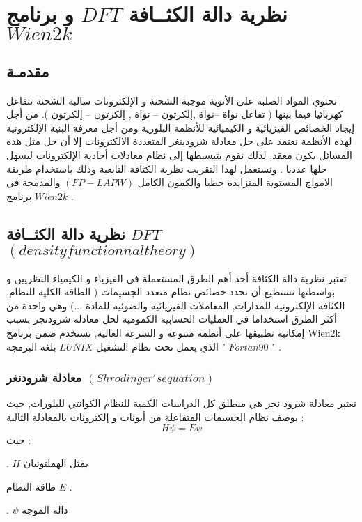 
\chapter{  نظرية دالة الكثــافة $ DFT $ و برنامج $ Wien2k $  } %

\label{Chapter2} 


\section*{ مقدمـة }

تحتوي المواد الصلبة على الأنوية موجبة الشحنة و الإلكترونات سالبة الشحنة تتفاعل كهربائيا فيما بينها ( تفاعل نواة –نواة ,إلكرتون – نواة , إلكرتون – إلكرتون ). 
من أجل إيجاد الخصائص الفيزيائية و الكيميائية للأنظمة البلورية ومن أجل معرفة البنية الإلكترونية لهذه الأنظمة  نعتمد على حل معادلة  شرودينغر المتعددة الالكترونات إلا أن حل مثل هذه المسائل يكون معقد, لذلك نقوم بتبسيطها إلى نظام معادلات أحادية الإلكترونات ليسهل حلها عدديا . ونستعمل لهذا التقريب نظرية الكثافة التابعية وذلك باستخدام طريقة الامواج المستوية المتزايدة خطيا والكمون الكامل $ (FP-LAPW) $ والمدمجة في برنامج $ Wien2k $ .

\section{ ‫نظرية دالة الكثــافة‬ ‫‪$ DFT‬‬ $ $ ( density functionnal theory ) $ }

تعتبر نظرية دالة الكثافة أحد أهم الطرق المستعملة  في الفيزياء و الكيمياء النظريين  و بواسطتها نستطيع أن نحدد خصائص نظام متعدد الجسيمات ( الطاقة الكلية للنظام, الكثافة الإلكترونية للمدارات, المعاملات الفيزيائية والضوئية للمادة ...)   وهي واحدة من أكثر الطرق استخداما في العمليات الحسابية الكمومية  لحل معادلة شرودنجر بسبب إمكانية تطبيقها على أنظمة متنوعة و السرعة العالية, تستخدم ضمن برنامج Wien2k الذي يعمل تحت نظام التشغيل $ LUNIX  $ بلغة البرمجة " $ Fortan 90 $ " .
\\


\subsection{ معادلة شرودنغر $ ( Shrodinger's equation ) $ }

تعتبر معادلة  شرود نجر هي منطلق كل الدراسات الكمية للنظام الكوانتي للبلورات, حيث  يوصف نظام الجسيمات المتفاعلة من أيونات و إلكترونات بالمعادلة التالية :         	
\begin{equation}\label{}
 H \psi = E \psi 
\end{equation}
حيث :
\begin{list}{}{}
	\item 
	 . $ H  $ يمثل الهملتونيان 
	\item 
	  طاقة النظام $ E $ .
	\item 
	. $ \psi $ دالة الموجة 
\end{list}

